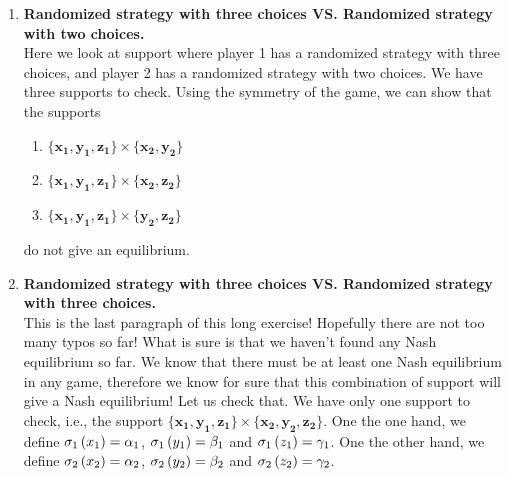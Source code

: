 \begin{enumerate} [label=\Alph*. ]
\begin{enumerate} [label*= (\arabic*)]
    \item The support $\mathbf{\{x_1, z_1\}} \times \mathbf{\{x_2, y_2, z_2\}}$ does not give an equilibrium because the support $\mathbf{\{x_1, z_1\}} \times \mathbf{\{x_2, y_2\}}$ does not give an equilibrium.
    
    \item The support $\mathbf{\{y_1, z_1\}} \times \mathbf{\{x_2, y_2, z_2\}}$ does not give an equilibrium because the support $\mathbf{\{y_1, z_1\}} \times \mathbf{\{x_2, y_2\}}$ does not give an equilibrium.
\end{enumerate}

\item \textbf{Randomized strategy with three choices VS. Randomized strategy with two choices.} \\
Here we look at support where player 1 has a randomized strategy with three choices, and player 2 has a randomized strategy with two choices. We have three supports to check. Using the symmetry of the game, we can show that the supports
\begin{enumerate} [label*= (\arabic*)]
    \item $\mathbf{\{x_1, y_1, z_1\}} \times \mathbf{\{x_2, y_2\}}$
    \item $\mathbf{\{x_1, y_1, z_1\}} \times \mathbf{\{x_2, z_2\}}$
    \item $\mathbf{\{x_1, y_1, z_1\}} \times \mathbf{\{y_2, z_2\}}$
\end{enumerate}

do not give an equilibrium.

\item \textbf{Randomized strategy with three choices VS. Randomized strategy with three choices.} \\
This is the last paragraph of this long exercise! Hopefully there are not too many typos so far! What is sure is that we haven't found any Nash equilibrium so far. We know that there must be at least one Nash equilibrium in any game, therefore we know for sure that this combination of support will give a Nash equilibrium! Let us check that. We have only one support to check, i.e., the support $\mathbf{\{x_1, y_1, z_1\}} \times \mathbf{\{x_2, y_2, z_2\}}$.
One the one hand, we define $\sigma_{1} \left(x_1\right) = \alpha_1$, $\sigma_{1} \left(y_1\right) = \beta_1$ and $\sigma_{1} \left(z_1\right) = \gamma_1$.
One the other hand, we define $\sigma_{2} \left(x_2\right) = \alpha_2$, $\sigma_{2} \left(y_2\right) = \beta_2$ and $\sigma_{2} \left(z_2\right) = \gamma_2$.


\end{enumerate}
